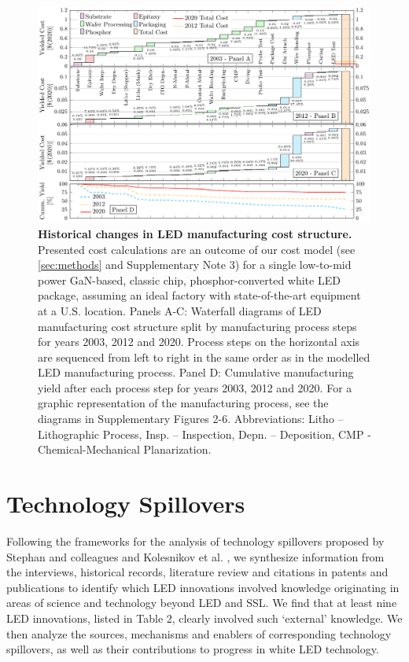 \documentclass[parskip=full]{article}
\begin{document}
\begin{figure}[ht!]
\centering
\includegraphics[width=17.5cm]{figures/costmodel_results_years.pdf}
\caption{\textbf{Historical changes in LED manufacturing cost structure.} Presented cost calculations are an outcome of our cost model (see \cref{sec:methods} and Supplementary Note 3) for a single low-to-mid power GaN-based, classic chip, phosphor-converted white LED package, assuming an ideal factory with state-of-the-art equipment at a U.S. location. Panels A-C: Waterfall diagrams of LED manufacturing cost structure split by manufacturing process steps for years 2003, 2012 and 2020. Process steps on the horizontal axis are sequenced from left to right in the same order as in the modelled LED manufacturing process. Panel D: Cumulative manufacturing yield after each process step for years 2003, 2012 and 2020. For a graphic representation of the manufacturing process, see the diagrams in Supplementary Figures 2-6. Abbreviations: Litho – Lithographic Process, Insp. – Inspection, Depn. – Deposition, CMP - Chemical-Mechanical Planarization.}
\label{fgr:costmodel}
\end{figure}

\section{Technology Spillovers}

Following the frameworks for the analysis of technology spillovers proposed by Stephan and colleagues \cite{Stephan2021} and Kolesnikov et al. \cite{kolesnikov2022technology}, we synthesize information from the interviews, historical records, literature review and citations in patents and publications to identify which LED innovations involved knowledge originating in areas of science and technology beyond LED and SSL. We find that at least nine LED innovations, listed in Table 2, clearly involved such ‘external’ knowledge. We then analyze the sources, mechanisms and enablers of corresponding technology spillovers, as well as their contributions to progress in white LED technology. 
\end{document}
